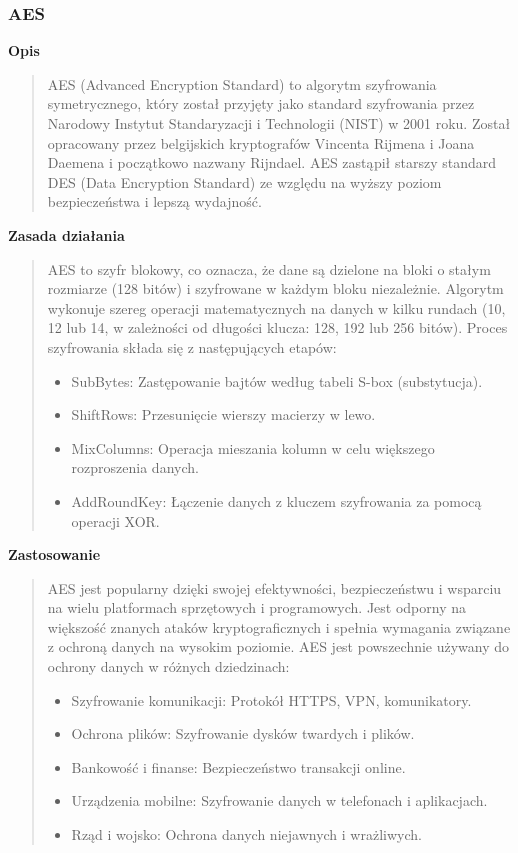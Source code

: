 \documentclass[12pt,a4paper]{article}
\begin{document}
\subsubsection{AES}
\noindent\textbf{Opis}
\begin{quotation}\noindent AES (Advanced Encryption Standard) to algorytm szyfrowania symetrycznego, który został przyjęty jako standard szyfrowania przez Narodowy Instytut Standaryzacji i Technologii (NIST) w 2001 roku. Został opracowany przez belgijskich kryptografów Vincenta Rijmena i Joana Daemena i początkowo nazwany Rijndael. AES zastąpił starszy standard DES (Data Encryption Standard) ze względu na wyższy poziom bezpieczeństwa i lepszą wydajność.\end{quotation}

\noindent\textbf{Zasada działania}
\begin{quotation}\noindent AES to szyfr blokowy, co oznacza, że dane są dzielone na bloki o stałym rozmiarze (128 bitów) i szyfrowane w każdym bloku niezależnie. Algorytm wykonuje szereg operacji matematycznych na danych w kilku rundach (10, 12 lub 14, w zależności od długości klucza: 128, 192 lub 256 bitów). Proces szyfrowania składa się z następujących etapów:
\begin{itemize}
\item SubBytes: Zastępowanie bajtów według tabeli S-box (substytucja).
\item ShiftRows: Przesunięcie wierszy macierzy w lewo.
\item MixColumns: Operacja mieszania kolumn w celu większego rozproszenia danych.
\item AddRoundKey: Łączenie danych z kluczem szyfrowania za pomocą operacji XOR.
\end{itemize}
\end{quotation}

\noindent\textbf{Zastosowanie}
\begin{quotation}\noindent AES jest popularny dzięki swojej efektywności, bezpieczeństwu i wsparciu na wielu platformach sprzętowych i programowych. Jest odporny na większość znanych ataków kryptograficznych i spełnia wymagania związane z ochroną danych na wysokim poziomie. AES jest powszechnie używany do ochrony danych w różnych dziedzinach:
\begin{itemize}
\item Szyfrowanie komunikacji: Protokół HTTPS, VPN, komunikatory.
\item Ochrona plików: Szyfrowanie dysków twardych i plików.
\item Bankowość i finanse: Bezpieczeństwo transakcji online.
\item Urządzenia mobilne: Szyfrowanie danych w telefonach i aplikacjach.
\item Rząd i wojsko: Ochrona danych niejawnych i wrażliwych.
\end{itemize}
\end{quotation}
\end{document}
